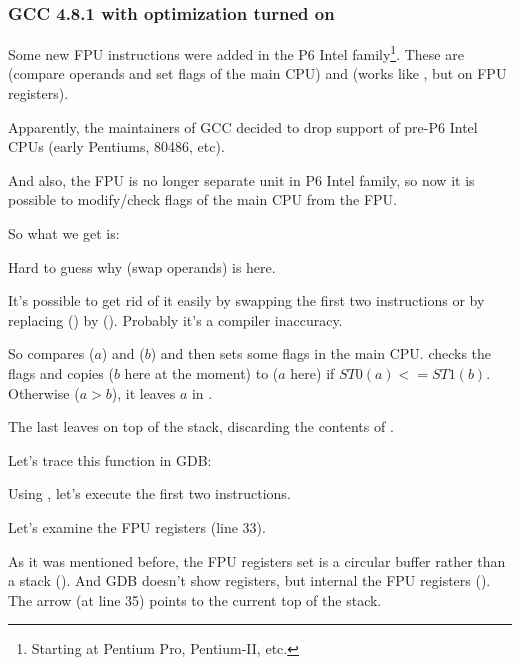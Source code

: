 \subsubsection{GCC 4.8.1 with \Othree optimization turned on}
\label{gcc481_o3}

Some new FPU instructions were added in the P6 Intel family\footnote{Starting at Pentium Pro, Pentium-II, etc.}.
These are  (compare operands and set flags of the main CPU) and 
 (works like , but on FPU registers).

Apparently, the maintainers of GCC decided to drop support of pre-P6 Intel CPUs (early Pentiums, 80486, etc{}).

And also, the FPU is no longer separate unit in P6 Intel family, so now it is possible to modify/check flags of the main CPU from the FPU.

So what we get is:



Hard to guess why  (swap operands) is here.

It's possible to get rid of it easily by swapping the first two \FLD instructions or by replacing 
 () by  ().
Probably it's a compiler inaccuracy.

So  compares  ($a$) and  ($b$) 
and then sets some flags in the main CPU.
 checks the flags and copies  
($b$ here at the moment) to 
 ($a$ here) if $ST0 (a) <= ST1 (b)$.
Otherwise ($a>b$), it leaves $a$ in .

The last \FSTP leaves  on top of the stack, discarding the contents of .

Let's trace this function in GDB:



Using , 
let's execute the first two \FLD instructions.

Let's examine the FPU registers (line 33).

As it was mentioned before, the FPU registers set is a circular buffer rather than a stack ().
And GDB doesn't show  registers, but internal the FPU registers (). 
The arrow (at line 35) points to the current top of the stack.

